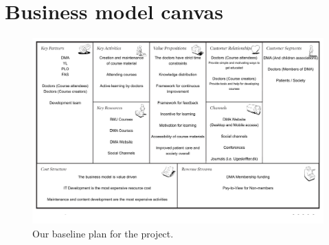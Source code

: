 \section{Business model canvas}
\begin{figure}
 \begin{center}
  \includegraphics[width=1\textwidth]{figures/business-model-canvas.pdf}
  \caption{Our baseline plan for the project.\label{dmaorganisation}}
 \end{center}
\end{figure}
